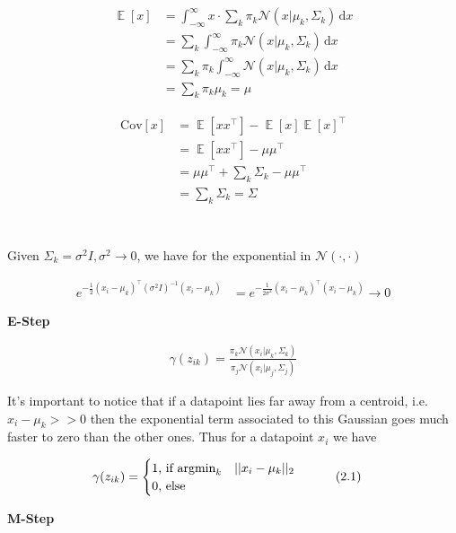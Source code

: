 \documentclass[11pt]{article}
\newcommand{\exercise}{\section{}}
\DeclareMathOperator{\E}{\mathbb{E}}
\newcommand{\intf}[4]{\int_{#1}^{#2} \! #3 \, \mathrm{d}#4}
\newcommand{\sumf}[3]{\sum_{#1}^{#2} #3}
\newcommand{\tf}[1]{{#1}^{\intercal}}
\newcommand{\ifelse}[4]{%
\begingroup
\begin{cases}
  {#1} \text{, if {#2}} \\
  {#3} \text{, {#4}}
\end{cases}
\endgroup
}
\begin{document}
\exercise

\begin{align*}
\E[x] &= \intf{-\infty}{\infty}{x \cdot \sumf{k}{}{\pi_k \mathcal{N}(x | \mu_k, \Sigma_k)} }{x} \\
&= \sumf{k}{}{ \intf{-\infty}{\infty}{\pi_k \mathcal{N}(x | \mu_k, \Sigma_k)}{x}} \\
&= \sumf{k}{}{ \pi_k \intf{-\infty}{\infty}{ \mathcal{N}(x | \mu_k, \Sigma_k)}{x}} \\
&= \sumf{k}{}{ \pi_k \mu_k } = \mu \tag{1.1}
\end{align*}

\begin{align*}
\text{Cov}[x] &= \E[x \tf{x}] - \E[x] \tf{\E[x]} \\
&= \E[x \tf{x}] - \mu \tf{\mu} \tag{by 1.1} \\
&= \mu \tf{\mu} + \sumf{k}{}{\Sigma_k} - \mu \tf{\mu} \tag{by Bishop 2.62} \\
&= \sumf{k}{}{\Sigma_k} = \Sigma \\
\end{align*}

\exercise

Given $\Sigma_k = \sigma^2 I, \sigma^2 \rightarrow 0$, we have for the exponential in $\mathcal{N}( \cdot, \cdot )$

\begin{align*}
e^{-\frac{1}{2} \tf{ (x_i - \mu_k) } (\sigma^2 I)^{-1} (x_i - \mu_k)} &= e^{-\frac{1}{2 \sigma^2} \tf{ (x_i - \mu_k) } (x_i - \mu_k)} \rightarrow 0 \tag{ $\sigma^2 \rightarrow 0$}
\end{align*}

\noindent \textbf{E-Step}

\begin{align*}
\gamma(z_{ik}) = \frac{ \pi_k \mathcal{N}( x_i | \mu_k, \Sigma_k ) }{ \pi_j \mathcal{N}( x_i | \mu_j, \Sigma_j ) }
\end{align*}

\noindent It's important to notice that if a datapoint lies far away from a centroid, i.e. $x_i - \mu_k >> 0$ then the exponential term associated to this Gaussian goes much faster to zero than the other ones. Thus for a datapoint $x_i$ we have

\begin{align*}
\gamma(z_{ik})  &= \ifelse{1}{$ \text{argmin}_k \quad || x_i - \mu_k ||_2 $}{0}{\text{else}} \tag{2.1}
\end{align*}

\noindent \textbf{M-Step}
\end{document}
